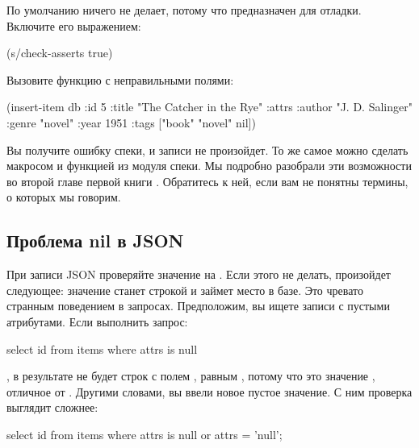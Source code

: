 По умолчанию  ничего не делает, потому что предназначен для отладки. Включите его выражением:

\begin{english}
  \begin{clojure}
(s/check-asserts true)
  \end{clojure}
\end{english}

Вызовите функцию с неправильными полями:

\begin{english}
  \begin{clojure}
(insert-item db {:id 5
                 :title "The Catcher in the Rye"
                 :attrs {:author "J. D. Salinger"
                         :genre "novel"
                         :year 1951}
                 :tags ["book" "novel" nil]})
  \end{clojure}
\end{english}

Вы получите ошибку спеки, и записи не произойдет. То же самое можно сделать макросом  и функцией  из модуля спеки. Мы подробно разобрали эти возможности во второй главе первой книги . Обратитесь к ней, если вам не понятны термины, о которых мы говорим.

\subsection{Проблема nil в JSON}

При записи JSON проверяйте значение на . Если этого не делать, произойдет следующее: значение  станет строкой  и займет место в базе. Это чревато странным поведением в запросах. Предположим, вы ищете записи с пустыми атрибутами. Если выполнить запрос:

\begin{english}
  \begin{sql}
select id from items where attrs is null
  \end{sql}
\end{english}

, в результате не будет строк с полем , равным , потому что это значение , отличное от . Другими словами, вы ввели новое пустое значение. С ним проверка выглядит сложнее:

\begin{english}
  \begin{sql}
select id from items where attrs is null or attrs = 'null';
  \end{sql}
\end{english}

